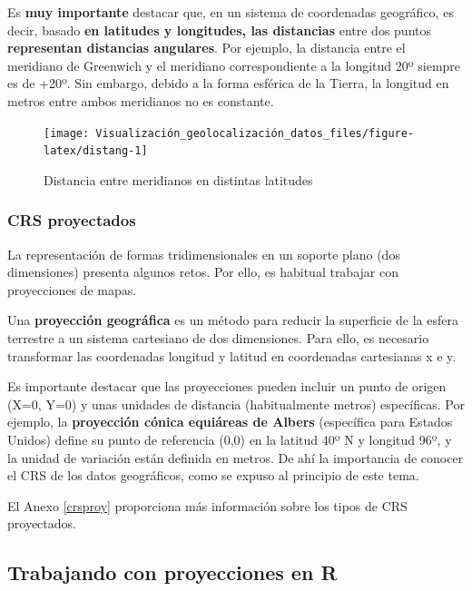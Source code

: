 \documentclass[
]{book}
\theoremstyle{definition}
\theoremstyle{definition}
\theoremstyle{definition}
\theoremstyle{definition}
\theoremstyle{remark}
\begin{document}
Es \textbf{muy importante} destacar que, en un sistema de coordenadas geográfico, es
decir, basado \textbf{en latitudes y longitudes, las distancias} entre dos puntos
\textbf{representan distancias angulares}. Por ejemplo, la distancia entre el
meridiano de Greenwich y el meridiano correspondiente a la longitud 20º siempre
es de +20º. Sin embargo, debido a la forma esférica de la Tierra, la longitud en
metros entre ambos meridianos no es constante.

\begin{figure}

{\centering \texttt{[image: Visualización\_geolocalización\_datos\_files/figure-latex/distang-1]} 

}

\caption{Distancia entre meridianos en distintas latitudes}\label{fig:distang}
\end{figure}

\hypertarget{crs-proyectados}{%
\subsubsection{CRS proyectados}\label{crs-proyectados}}

La representación de formas tridimensionales en un soporte plano (dos
dimensiones) presenta algunos retos. Por ello, es habitual trabajar con
proyecciones de mapas.

Una \textbf{proyección geográfica} es un método para reducir la superficie de la
esfera terrestre a un sistema cartesiano de dos dimensiones. Para ello, es
necesario transformar las coordenadas longitud y latitud en coordenadas
cartesianas x e y.

Es importante destacar que las proyecciones pueden incluir un punto de origen
(X=0, Y=0) y unas unidades de distancia (habitualmente metros) específicas. Por
ejemplo, la \textbf{proyección cónica equiáreas de Albers} (específica para Estados
Unidos) define su punto de referencia (0,0) en la latitud 40º N y longitud 96º,
y la unidad de variación están definida en metros. De ahí la importancia de
conocer el CRS de los datos geográficos, como se expuso al principio de este
tema.

El Anexo \ref{crsproy} proporciona más información sobre los tipos de CRS
proyectados.

\hypertarget{trabajando-con-proyecciones-en-r}{%
\subsection{\texorpdfstring{Trabajando con proyecciones en \textbf{R}}{Trabajando con proyecciones en R}}\label{trabajando-con-proyecciones-en-r}}
\end{document}

